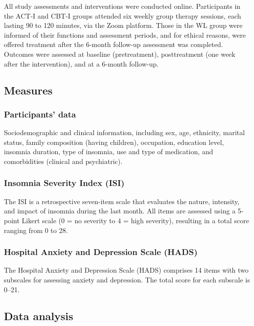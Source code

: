 \documentclass[
  man]{apa6}
\begin{document}
All study assessments and interventions were conducted online. Participants in the ACT-I and CBT-I groups attended six weekly group therapy sessions, each lasting 90 to 120 minutes, via the Zoom platform. Those in the WL group were informed of their functions and assessment periods, and for ethical reasons, were offered treatment after the 6-month follow-up assessment was completed. Outcomes were assessed at baseline (pretreatment), posttreatment (one week after the intervention), and at a 6-month follow-up.

\subsection{Measures}\label{measures}

\subsubsection{Participants' data}\label{participants-data}

Sociodemographic and clinical information, including sex, age, ethnicity, marital status, family composition (having children), occupation, education level, insomnia duration, type of insomnia, use and type of medication, and comorbidities (clinical and psychiatric).

\subsubsection{Insomnia Severity Index (ISI)}\label{insomnia-severity-index-isi}

The ISI is a retrospective seven-item scale that evaluates the nature, intensity, and impact of insomnia during the last month. All items are assessed using a 5-point Likert scale (0 = no severity to 4 = high severity), resulting in a total score ranging from 0 to 28.

\subsubsection{Hospital Anxiety and Depression Scale (HADS)}\label{hospital-anxiety-and-depression-scale-hads}

The Hospital Anxiety and Depression Scale (HADS) comprises 14 items with two subscales for assessing anxiety and depression. The total score for each subscale is 0--21.

\subsection{Data analysis}\label{data-analysis}
\end{document}
